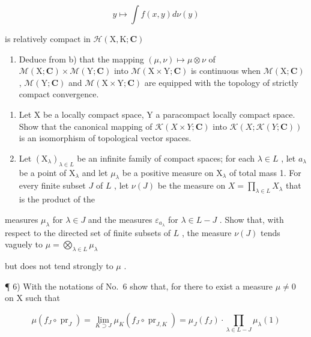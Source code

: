 \[
y \mapsto \int f (x, y) d \nu (y)
\]

is relatively compact in \(\mathcal{H}(\mathrm{X},\mathrm{K};\mathbf{C})\)

\begin{enumerate}
\def\labelenumi{\alph{enumi})}
\setcounter{enumi}{2}
\tightlist
\item
  Deduce from b) that the mapping \((\mu, \nu) \mapsto \mu \otimes \nu\) of \(\mathcal{M}(\mathrm{X}; \mathbf{C}) \times \mathcal{M}(\mathrm{Y}; \mathbf{C})\) into \(\mathcal{M}(\mathrm{X} \times \mathrm{Y}; \mathbf{C})\) is continuous when \(\mathcal{M}(\mathrm{X}; \mathbf{C})\) , \(\mathcal{M}(\mathrm{Y}; \mathbf{C})\) and \(\mathcal{M}(\mathrm{X} \times \mathrm{Y}; \mathbf{C})\) are equipped with the topology of strictly compact convergence.
\end{enumerate}

\begin{enumerate}
\def\labelenumi{\arabic{enumi})}
\setcounter{enumi}{3}
\item
  Let X be a locally compact space, Y a paracompact locally compact space. Show that the canonical mapping of \(\mathcal{K}(X \times Y; \mathbf{C})\) into \(\mathcal{K}(X; \mathcal{K}(Y; \mathbf{C}))\) is an isomorphism of topological vector spaces.
\item
  Let \((\mathrm{X}_{\lambda})_{\lambda \in L}\) be an infinite family of compact spaces; for each \(\lambda \in L\) , let \(a_{\lambda}\) be a point of \(\mathrm{X}_{\lambda}\) and let \(\mu_{\lambda}\) be a positive measure on \(\mathrm{X}_{\lambda}\) of total mass 1. For every finite subset \(J\) of \(L\) , let \(\nu(J)\) be the measure on \(X = \prod_{\lambda \in L} X_{\lambda}\) that is the product of the
\end{enumerate}

measures \(\mu_{\lambda}\) for \(\lambda \in J\) and the measures \(\varepsilon_{a_{\lambda}}\) for \(\lambda \in L - J\) . Show that, with respect to the directed set of finite subsets of \(L\) , the measure \(\nu(J)\) tends vaguely to \(\mu = \bigotimes_{\lambda \in L} \mu_{\lambda}\)

but does not tend strongly to \(\mu\) .

¶ 6) With the notations of No.~6 show that, for there to exist a measure \(\mu \neq 0\) on X such that

\[
\mu \left(f _ {J} \circ \operatorname{pr} _ {J}\right) = \lim _ {K \supset J} \mu_ {K} \left(f _ {J} \circ \operatorname{pr} _ {J, K}\right) = \mu_ {J} \left(f _ {J}\right) \cdot \prod_ {\lambda \in L - J} \mu_ {\lambda} (1)\tag{1}
\]


